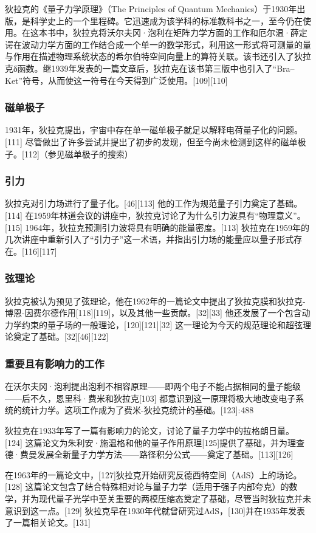 狄拉克的《量子力学原理》（The Principles of Quantum Mechanics）于1930年出版，是科学史上的一个里程碑。它迅速成为该学科的标准教科书之一，至今仍在使用。在这本书中，狄拉克将沃尔夫冈·泡利在矩阵力学方面的工作和厄尔温·薛定谔在波动力学方面的工作结合成一个单一的数学形式，利用这一形式将可测量的量与作用在描述物理系统状态的希尔伯特空间向量上的算符关联。该书还引入了狄拉克δ函数。继1939年发表的一篇文章后，狄拉克在该书第三版中也引入了“Bra–Ket”符号，从而使这一符号在今天得到广泛使用。[109][110]
\subsubsection{磁单极子}  
1931年，狄拉克提出，宇宙中存在单一磁单极子就足以解释电荷量子化的问题。[111] 尽管做出了许多尝试并提出了初步的发现，但至今尚未检测到这样的磁单极子。[112]（参见磁单极子的搜索）
\subsubsection{引力}  
狄拉克对引力场进行了量子化。[46][113] 他的工作为规范量子引力奠定了基础。[114] 在1959年林道会议的讲座中，狄拉克讨论了为什么引力波具有“物理意义”。[115] 1964年，狄拉克预测引力波将具有明确的能量密度。[113] 狄拉克在1959年的几次讲座中重新引入了“引力子”这一术语，并指出引力场的能量应以量子形式存在。[116][117]
\subsubsection{弦理论}  
狄拉克被认为预见了弦理论，他在1962年的一篇论文中提出了狄拉克膜和狄拉克-博恩-因费尔德作用[118][119]，以及其他一些贡献。[32][33] 他还发展了一个包含动力学约束的量子场的一般理论，[120][121][32] 这一理论为今天的规范理论和超弦理论奠定了基础。[32][46][122]
\subsubsection{重要且有影响力的工作} 
在沃尔夫冈·泡利提出泡利不相容原理——即两个电子不能占据相同的量子能级——后不久，恩里科·费米和狄拉克[103] 都意识到这一原理将极大地改变电子系统的统计力学。这项工作成为了费米-狄拉克统计的基础。[123]: 488

狄拉克在1933年写了一篇有影响力的论文，讨论了量子力学中的拉格朗日量。[124] 这篇论文为朱利安·施温格和他的量子作用原理[125]提供了基础，并为理查德·费曼发展全新量子力学方法——路径积分公式——奠定了基础。[113][126]

在1963年的一篇论文中，[127]狄拉克开始研究反德西特空间（AdS）上的场论。[128] 这篇论文包含了结合特殊相对论与量子力学（适用于强子内部夸克）的数学，并为现代量子光学中至关重要的两模压缩态奠定了基础，尽管当时狄拉克并未意识到这一点。[129] 狄拉克早在1930年代就曾研究过AdS，[130]并在1935年发表了一篇相关论文。[131]

